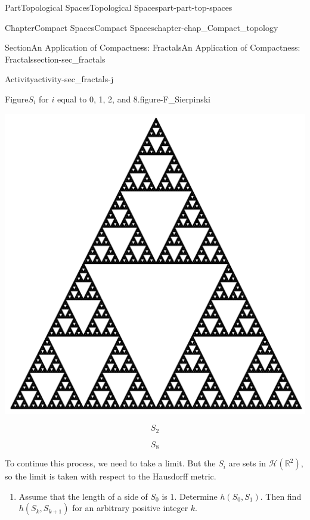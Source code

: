 \documentclass[oneside,10pt,]{book}
\numberwithin{equation}{chapter}
\newcommand{\R}{\mathbb{R}}
\begin{document}
\begin{partptx}{Part}{Topological Spaces}{}{Topological Spaces}{}{}{part-part-top-spaces}
\begin{chapterptx}{Chapter}{Compact Spaces}{}{Compact Spaces}{}{}{chapter-chap_Compact_topology}
\begin{sectionptx}{Section}{An Application of Compactness: Fractals}{}{An Application of Compactness: Fractals}{}{}{section-sec_fractals}
\begin{activity}{Activity}{}{activity-sec_fractals-j}
\begin{enumerate}[font=\bfseries,label=(\alph*),ref=\alph*]
\begin{figureptx}{Figure}{\(S_i\) for \(i\) equal to 0, 1, 2, and 8.}{figure-F_Sierpinski}{}
\begin{sidebyside}{2}{0}{0}{0}
\begin{sbspanel}{0.5}
\includegraphics[width=\linewidth]{external/S8.pdf}
\end{sbspanel}%
\end{sidebyside}%
\begin{sidebyside}{2}{0}{0}{0}%
\begin{sbspanel}{0.5}%
%
\begin{equation*}
S_2
\end{equation*}
%
\end{sbspanel}%
\begin{sbspanel}{0.5}%
\par
%
\begin{equation*}
S_8
\end{equation*}
%
\end{sbspanel}%
\end{sidebyside}%
\tcblower
\end{figureptx}%
To continue this process, we need to take a limit. But the \(S_i\) are sets in \(\mathcal{H}(\R^2)\), so the limit is taken with respect to the Hausdorff metric.%
\begin{enumerate}[font=\bfseries,label=(\roman*),ref=\theenumi.\roman*]%
\item{}Assume that the length of a side of \(S_0\) is \(1\). Determine \(h(S_0,S_1)\). Then find \(h(S_k, S_{k+1})\) for an arbitrary positive integer \(k\).%

\end{enumerate}
\end{enumerate}
\end{activity}
\end{sectionptx}
\end{chapterptx}
\end{partptx}
\end{document}
